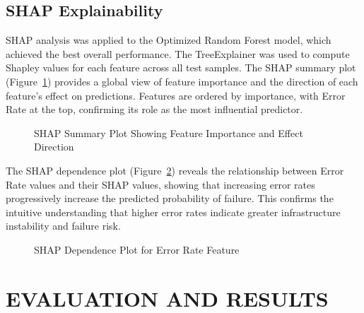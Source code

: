 \documentclass[12pt,letterpaper]{report}
\begin{document}
\section{SHAP Explainability}

SHAP analysis was applied to the Optimized Random Forest model, which achieved the best overall performance. The TreeExplainer was used to compute Shapley values for each feature across all test samples. The SHAP summary plot (Figure~\ref{fig:shap_summary}) provides a global view of feature importance and the direction of each feature's effect on predictions. Features are ordered by importance, with Error Rate at the top, confirming its role as the most influential predictor.

\begin{figure}[H]
\centering
{}
\caption{SHAP Summary Plot Showing Feature Importance and Effect Direction}
\label{fig:shap_summary}
\end{figure}

The SHAP dependence plot (Figure~\ref{fig:shap_dependence}) reveals the relationship between Error Rate values and their SHAP values, showing that increasing error rates progressively increase the predicted probability of failure. This confirms the intuitive understanding that higher error rates indicate greater infrastructure instability and failure risk.

\begin{figure}[H]
\centering
{}
\caption{SHAP Dependence Plot for Error Rate Feature}
\label{fig:shap_dependence}
\end{figure}


\chapter{EVALUATION AND RESULTS}
\end{document}
